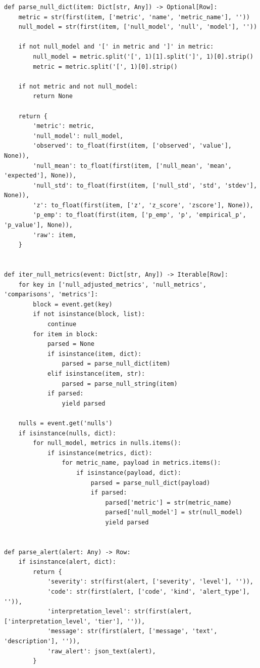 \documentclass[11pt,a4paper]{article}
\begin{document}
\begin{lstlisting}
def parse_null_dict(item: Dict[str, Any]) -> Optional[Row]:
    metric = str(first(item, ['metric', 'name', 'metric_name'], ''))
    null_model = str(first(item, ['null_model', 'null', 'model'], ''))

    if not null_model and '[' in metric and ']' in metric:
        null_model = metric.split('[', 1)[1].split(']', 1)[0].strip()
        metric = metric.split('[', 1)[0].strip()

    if not metric and not null_model:
        return None

    return {
        'metric': metric,
        'null_model': null_model,
        'observed': to_float(first(item, ['observed', 'value'], None)),
        'null_mean': to_float(first(item, ['null_mean', 'mean', 'expected'], None)),
        'null_std': to_float(first(item, ['null_std', 'std', 'stdev'], None)),
        'z': to_float(first(item, ['z', 'z_score', 'zscore'], None)),
        'p_emp': to_float(first(item, ['p_emp', 'p', 'empirical_p', 'p_value'], None)),
        'raw': item,
    }


def iter_null_metrics(event: Dict[str, Any]) -> Iterable[Row]:
    for key in ['null_adjusted_metrics', 'null_metrics', 'comparisons', 'metrics']:
        block = event.get(key)
        if not isinstance(block, list):
            continue
        for item in block:
            parsed = None
            if isinstance(item, dict):
                parsed = parse_null_dict(item)
            elif isinstance(item, str):
                parsed = parse_null_string(item)
            if parsed:
                yield parsed

    nulls = event.get('nulls')
    if isinstance(nulls, dict):
        for null_model, metrics in nulls.items():
            if isinstance(metrics, dict):
                for metric_name, payload in metrics.items():
                    if isinstance(payload, dict):
                        parsed = parse_null_dict(payload)
                        if parsed:
                            parsed['metric'] = str(metric_name)
                            parsed['null_model'] = str(null_model)
                            yield parsed


def parse_alert(alert: Any) -> Row:
    if isinstance(alert, dict):
        return {
            'severity': str(first(alert, ['severity', 'level'], '')),
            'code': str(first(alert, ['code', 'kind', 'alert_type'], '')),
            'interpretation_level': str(first(alert, ['interpretation_level', 'tier'], '')),
            'message': str(first(alert, ['message', 'text', 'description'], '')),
            'raw_alert': json_text(alert),
        }


\end{lstlisting}
\end{document}
